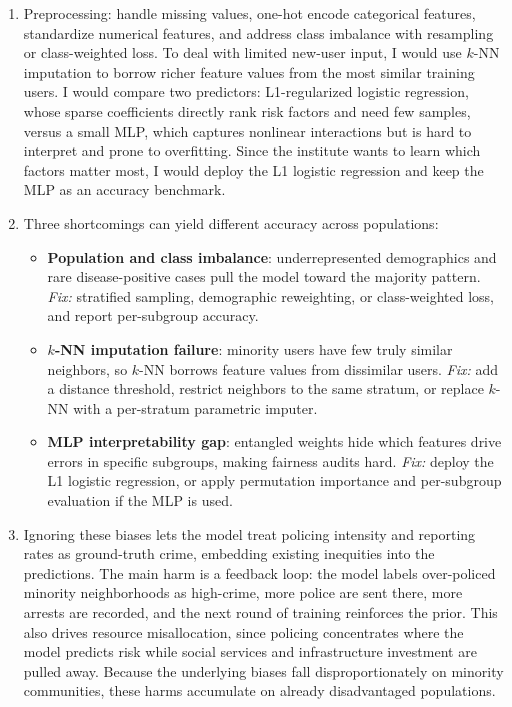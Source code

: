 \documentclass[fleqn]{article}
\begin{document}
\begin{enumerate}[label=(\alph*)]
\item
Preprocessing: handle missing values, one-hot encode categorical features, standardize numerical features, and address class imbalance with resampling or class-weighted loss. To deal with limited new-user input, I would use $k$-NN imputation to borrow richer feature values from the most similar training users. I would compare two predictors: L1-regularized logistic regression, whose sparse coefficients directly rank risk factors and need few samples, versus a small MLP, which captures nonlinear interactions but is hard to interpret and prone to overfitting. Since the institute wants to learn which factors matter most, I would deploy the L1 logistic regression and keep the MLP as an accuracy benchmark.

\item
Three shortcomings can yield different accuracy across populations:
\begin{itemize}
\item \textbf{Population and class imbalance}: underrepresented demographics and rare disease-positive cases pull the model toward the majority pattern. \emph{Fix:} stratified sampling, demographic reweighting, or class-weighted loss, and report per-subgroup accuracy.

\item \textbf{$k$-NN imputation failure}: minority users have few truly similar neighbors, so $k$-NN borrows feature values from dissimilar users. \emph{Fix:} add a distance threshold, restrict neighbors to the same stratum, or replace $k$-NN with a per-stratum parametric imputer.

\item \textbf{MLP interpretability gap}: entangled weights hide which features drive errors in specific subgroups, making fairness audits hard. \emph{Fix:} deploy the L1 logistic regression, or apply permutation importance and per-subgroup evaluation if the MLP is used.
\end{itemize}

\item
Ignoring these biases lets the model treat policing intensity and reporting rates as ground-truth crime, embedding existing inequities into the predictions. The main harm is a feedback loop: the model labels over-policed minority neighborhoods as high-crime, more police are sent there, more arrests are recorded, and the next round of training reinforces the prior. This also drives resource misallocation, since policing concentrates where the model predicts risk while social services and infrastructure investment are pulled away. Because the underlying biases fall disproportionately on minority communities, these harms accumulate on already disadvantaged populations.
\end{enumerate}
\end{document}
